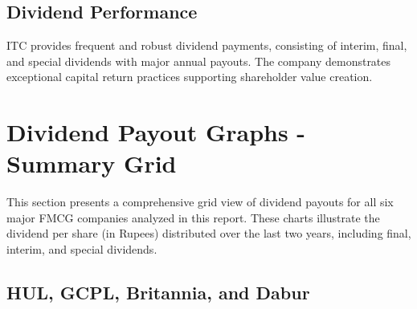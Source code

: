 \documentclass[12pt, a4paper]{report}
\begin{document}
\subsection{Dividend Performance}

ITC provides frequent and robust dividend payments, consisting of interim, final, and special dividends with major annual payouts. The company demonstrates exceptional capital return practices supporting shareholder value creation.

\vspace{1cm}

\newpage

\section*{Dividend Payout Graphs - Summary Grid}

This section presents a comprehensive grid view of dividend payouts for all six major FMCG companies analyzed in this report. These charts illustrate the dividend per share (in Rupees) distributed over the last two years, including final, interim, and special dividends.


\subsection*{HUL, GCPL, Britannia, and Dabur}
\end{document}
